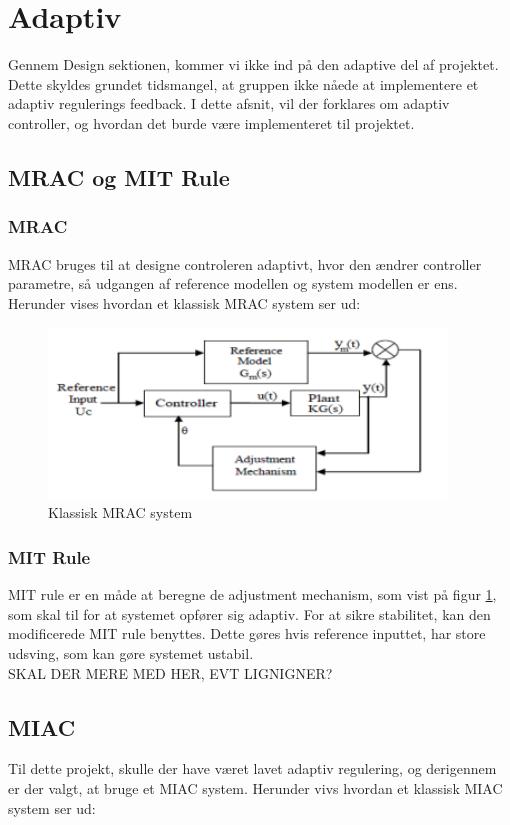 \section{Adaptiv}

Gennem Design sektionen, kommer vi ikke ind på den adaptive del af projektet. Dette skyldes grundet tidsmangel, at gruppen ikke nåede at implementere et adaptiv regulerings feedback. I dette afsnit, vil der forklares om adaptiv controller, og hvordan det burde være implementeret til projektet. 

\subsection{MRAC og MIT Rule}
\subsubsection{MRAC}
MRAC bruges til at designe controleren adaptivt, hvor den ændrer controller parametre, så udgangen af reference modellen og system modellen er ens. 
Herunder vises hvordan et klassisk MRAC system ser ud:


\begin{figure}[H]
	\centering
	\includegraphics[width = 300pt]{figur/MRAC}
	\caption{Klassisk MRAC system}
	\label{fig:MRAC}
\end{figure}

\subsubsection{MIT Rule}
MIT rule er en måde at beregne de adjustment mechanism, som vist på figur \ref{fig:MRAC}, som skal til for at systemet opfører sig adaptiv. For at sikre stabilitet, kan den modificerede MIT rule benyttes. Dette gøres hvis reference inputtet, har store udsving, som kan gøre systemet ustabil. \\

SKAL DER MERE MED HER, EVT LIGNIGNER?

\subsection{MIAC}
Til dette projekt, skulle der have været lavet adaptiv regulering, og derigennem er der valgt, at bruge et MIAC system. Herunder vivs hvordan et klassisk MIAC system ser ud:

